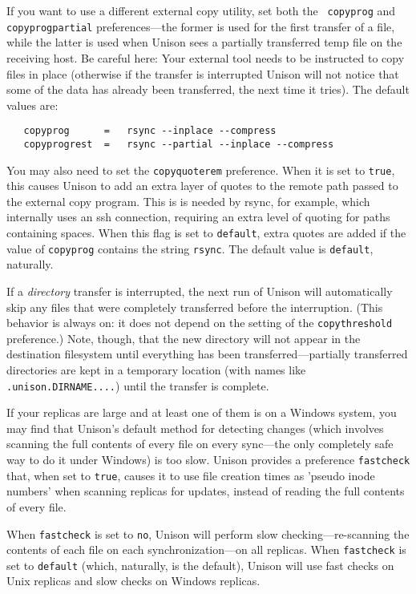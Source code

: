 \documentclass{article}
\begin{document}
If you want to use a different external copy utility, set both the {\tt
  copyprog} and {\tt copyprogpartial} preferences---the former is used for
the first transfer of a file, while the latter is used when Unison sees a
partially transferred temp file on the receiving host.  Be careful here:
Your external tool needs to be instructed to copy files in place (otherwise
if the transfer is interrupted Unison will not notice that some of the data
has already been transferred, the next time it tries).  The default values
are: 
\begin{verbatim}
   copyprog      =   rsync --inplace --compress
   copyprogrest  =   rsync --partial --inplace --compress
\end{verbatim}
You may also need to set the {\tt copyquoterem} preference.  When it is set
to {\tt true}, this causes Unison to add an extra layer of quotes to
the remote path passed to the external copy program. This is is needed by
rsync, for example, which internally uses an ssh connection, requiring an
extra level of quoting for paths containing spaces. When this flag is set to
{\tt default}, extra quotes are added if the value of {\tt copyprog}
contains the string {\tt rsync}.  The default value is {\tt default},
naturally.

If a {\em directory} transfer is interrupted, the next run of Unison will
automatically skip any files that were completely transferred before the
interruption.  (This behavior is always on: it does not depend on the
setting of the {\tt copythreshold} preference.)  Note, though, that the new
directory will not appear in the destination filesystem until everything has
been transferred---partially transferred directories are kept in a temporary
location (with names like {\tt .unison.DIRNAME....}) until the transfer is
complete.



If your replicas are large and at least one of them is on a Windows
system, you may find that Unison's default method for detecting changes
(which involves scanning the full contents of every file on every
sync---the only completely safe way to do it under Windows) is too slow.
Unison provides a preference {\tt fastcheck} that, when set to
\verb|true|, causes it to use file creation times as 'pseudo inode
numbers' when scanning replicas for updates, instead of reading the full
contents of every file.  

When \verb|fastcheck| is set to \verb|no|,
Unison will perform slow checking---re-scanning the contents of each file
on each synchronization---on all replicas.  When \verb|fastcheck| is set
to \verb|default| (which, naturally, is the default), Unison will use
fast checks on Unix replicas and slow checks on Windows replicas.
\end{document}
